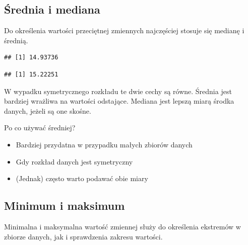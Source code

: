 \documentclass[
  paper=6in:9in,pagesize=pdftex,headinclude=on,footinclude=on,10pt]{scrbook}
\newenvironment{Shaded}{\begin{snugshade}}{\end{snugshade}}
\newcommand{\AttributeTok}[1]{\textcolor[rgb]{0.13,0.29,0.53}{#1}}
\newcommand{\ConstantTok}[1]{\textcolor[rgb]{0.56,0.35,0.01}{#1}}
\newcommand{\FunctionTok}[1]{\textcolor[rgb]{0.13,0.29,0.53}{\textbf{#1}}}
\newcommand{\NormalTok}[1]{#1}
\newcommand{\SpecialCharTok}[1]{\textcolor[rgb]{0.81,0.36,0.00}{\textbf{#1}}}
\providecommand{\tightlist}{%
  \setlength{\itemsep}{0pt}\setlength{\parskip}{0pt}}
\begin{document}
\subsection{Średnia i mediana}\label{ux15brednia-i-mediana}

Do określenia wartości przeciętnej zmiennych najczęściej stosuje się medianę i średnią.

\begin{Shaded}
\end{Shaded}

\begin{verbatim}
## [1] 14.93736
\end{verbatim}

\begin{Shaded}
\end{Shaded}

\begin{verbatim}
## [1] 15.22251
\end{verbatim}

W wypadku symetrycznego rozkładu te dwie cechy są równe.
Średnia jest bardziej wrażliwa na wartości odstające.
Mediana jest lepszą miarą środka danych, jeżeli są one skośne.

Po co używać średniej?

\begin{itemize}
\tightlist
\item
  Bardziej przydatna w przypadku małych zbiorów danych
\item
  Gdy rozkład danych jest symetryczny
\item
  (Jednak) często warto podawać obie miary
\end{itemize}

\subsection{Minimum i maksimum}\label{minimum-i-maksimum}

Minimalna i maksymalna wartość zmiennej służy do określenia ekstremów w zbiorze danych, jak i sprawdzenia zakresu wartości.
\end{document}
